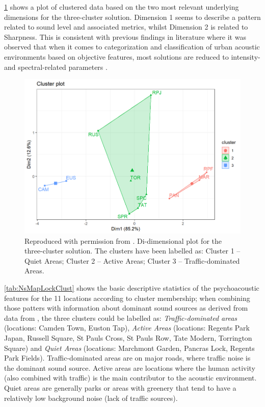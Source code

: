 \cref{fig:NsMapLockBiplot} shows a plot of clustered data based on the two most relevant underlying dimensions for the three-cluster solution. Dimension 1 seems to describe a pattern related to sound level and associated metrics, whilst Dimension 2 is related to Sharpness. This is consistent with previous findings in literature where it was observed that when it comes to categorization and classification of urban acoustic environments based on objective features, most solutions are reduced to intensity- and spectral-related parameters . 

\begin{figure}
  \caption{Reproduced with permission from \citet{Aletta2020Assessing}. Di-dimensional plot for the three-cluster solution. The clusters have been labelled as: Cluster 1 -- Quiet Areas; Cluster 2 -- Active Areas; Cluster 3 -- Traffic-dominated Areas. \label{fig:NsMapLockBiplot}}
  \centering
  \includegraphics[width=\textwidth]{Figures/NoiseMappingLockdown Fig 7.png}
\end{figure}

\cref{tab:NsMapLockClust} shows the basic descriptive statistics of the psychoacoustic features for the 11 locations according to cluster membership; when combining those patters with information about dominant sound sources as derived from data from , the three clusters could be labelled as: \emph{Traffic-dominated areas} (locations: Camden Town, Euston Tap), \emph{Active Areas} (locations: Regents Park Japan, Russell Square, St Pauls Cross, St Pauls Row, Tate Modern, Torrington Square) and \emph{Quiet Areas} (locations: Marchmont Garden, Pancras Lock, Regents Park Fields). Traffic-dominated areas are on major roads, where traffic noise is the dominant sound source. Active areas are locations where the human activity (also combined with traffic) is the main contributor to the acoustic environment. Quiet areas are generally parks or areas with greenery that tend to have a relatively low background noise (lack of traffic sources).

